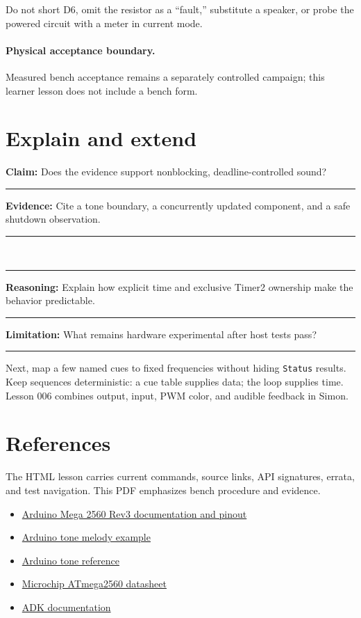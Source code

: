 \documentclass[11pt]{article}
\newcommand{\blank}[1]{\rule{#1}{0.4pt}}
\begin{document}
Do not short D6, omit the resistor as a ``fault,'' substitute a speaker, or probe
the powered circuit with a meter in current mode.

\paragraph{Physical acceptance boundary.}
Measured bench acceptance remains a separately controlled campaign; this
learner lesson does not include a bench form.
\section{Explain and extend}

\textbf{Claim:} Does the evidence support nonblocking, deadline-controlled sound?\\[8pt]
\blank{6.8in}

\textbf{Evidence:} Cite a tone boundary, a concurrently updated component, and a
safe shutdown observation.\\[8pt]
\blank{6.8in}\\[8pt]
\blank{6.8in}

\textbf{Reasoning:} Explain how explicit time and exclusive Timer2 ownership make
the behavior predictable.\\[8pt]
\blank{6.8in}

\textbf{Limitation:} What remains hardware experimental after host tests pass?\\[8pt]
\blank{6.8in}

Next, map a few named cues to fixed frequencies without hiding \texttt{Status}
results. Keep sequences deterministic: a cue table supplies data; the loop supplies
time. Lesson 006 combines output, input, PWM color, and audible feedback in Simon.

\section{References}

The HTML lesson carries current commands, source links, API signatures, errata,
and test navigation. This PDF emphasizes bench procedure and evidence.

\begin{itemize}
    \item \href{https://docs.arduino.cc/hardware/mega-2560}
          {Arduino Mega 2560 Rev3 documentation and pinout}
    \item \href{https://docs.arduino.cc/built-in-examples/digital/toneMelody/}
          {Arduino tone melody example}
    \item \href{https://docs.arduino.cc/language-reference/en/functions/advanced-io/tone/}
          {Arduino tone reference}
    \item \href{https://www.microchip.com/en-us/product/ATmega2560}
          {Microchip ATmega2560 datasheet}
    \item \href{https://spincyc.github.io/adk/}{ADK documentation}
\end{itemize}
\end{document}
